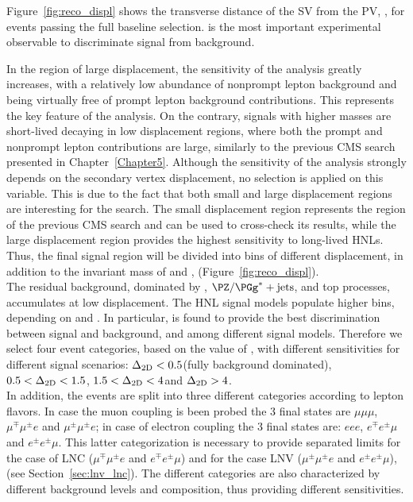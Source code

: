 Figure~\ref{fig:reco_displ} shows the transverse
distance of the SV from the PV, \Deltwod, for events
passing the full baseline selection. \Deltwod is the most important
experimental observable to discriminate signal from background.

In the region of large displacement, the sensitivity of the analysis
greatly increases, with a relatively low abundance of nonprompt lepton
background and being virtually free of prompt lepton background
contributions. This represents the key feature of the analysis.
On the contrary, signals with higher masses are short-lived \hnl
decaying in low displacement regions, where both the prompt and
nonprompt lepton contributions are large, similarly to the previous
CMS search presented in Chapter~\ref{Chapter5}.
Although the sensitivity of the analysis strongly depends on the
secondary vertex displacement, no selection is applied on this
variable. This is due to the fact that both small and large
displacement regions are interesting for the search. The small
displacement region represents the region of the previous CMS search
and can be used to cross-check its results, while the large
displacement region provides the highest sensitivity to long-lived
HNLs. 
Thus, the final signal region will be divided into bins of different
displacement, in addition to the invariant mass of \ltwo and \lthree,
\mtwol (Figure~\ref{fig:reco_displ}).\\

The residual background, dominated by \Xg,
$\PZ/\PGg^{\ast}+\mathrm{jets}$, and top processes, accumulates at low
displacement. The HNL signal models populate higher \Deltwod bins, depending on \mhnl and \mixpar. In particular, \Deltwod
is found to provide the best discrimination between signal and
background, and among different signal models.
Therefore we select four event categories, based on the value of
\Deltwod, with different sensitivities for different signal
scenarios:
$\Delta_{\mathrm{2D}}<0.5$\cm (fully background dominated), $0.5<\Delta_{\mathrm{2D}}<1.5$\cm,
$1.5<\Delta_{\mathrm{2D}}<4$\cm and $\Delta_{\mathrm{2D}}>4$\cm.\\
In addition, the events are split into three different categories
according to lepton flavors. In case 
the muon coupling is been probed the 3 final states are $\mu\mu\mu$,  $\mu^{\mp}\mu^{\pm} e$ 
and $\mu^{\pm}\mu^{\pm}e$; in case of electron coupling the 3 final states
are: $eee$,  $e^{\mp}e^{\pm}\mu$ and $e^{\pm}e^{\pm}\mu$. This latter categorization
is necessary to provide separated limits for the case of LNC ($\mu^{\mp}\mu^{\pm} e$ and $e^{\mp}e^{\pm}\mu$)
and for the case LNV ($\mu^{\pm}\mu^{\pm} e$ and $e^{\pm}e^{\pm}\mu$), (see Section~\ref{sec:lnv_lnc}).
The different categories are also characterized by different
background levels and composition, thus providing different
sensitivities.


